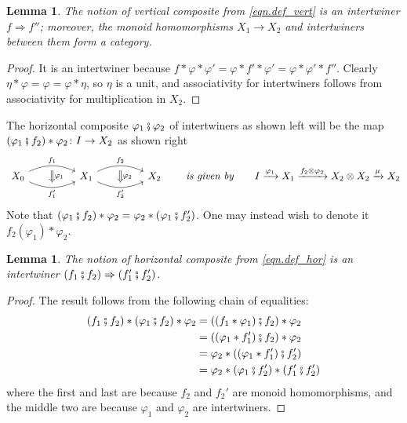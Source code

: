\documentclass[11pt, one side, article]{memoir}
\theoremstyle{definition}
\theoremstyle{plain}
\newtheorem{lemma}[definitionx]{Lemma}
\newcommand{\then}{\mathbin{\fatsemi}}
\newcommand{\To}[2][]{\xrightarrow[#1]{#2}}
\newcommand{\imp}{\Rightarrow}
\newcommand{\tn}[1]{\textnormal{#1}}
\newcommand{\0}{\textsf{0}}
\newcommand{\1}{\tn{\textsf{1}}}
\newcommand{\hh}[2][]{#1 \tn{\textit{#2}} #1}
\newcommand{\qqby}{\hh[\qquad]{is given by}}
\begin{document}
\begin{lemma}\label{lemma.ver_comp}
The notion of vertical composite from \eqref{eqn.def_vert} is an intertwiner $f\imp f''$; moreover, the monoid homomorphisms $X_1\to X_2$ and intertwiners between them form a category.
\end{lemma}
\begin{proof}
It is an intertwiner because $f*\varphi*\varphi'=\varphi*f'*\varphi'=\varphi*\varphi'*f''$. Clearly $\eta*\varphi=\varphi=\varphi*\eta$, so $\eta$ is a unit, and associativity for intertwiners follows from associativity for multiplication in $X_2$.
\end{proof}

The horizontal composite $\varphi_1\then\varphi_2$ of intertwiners as shown left will be the map $(\varphi_1\then f_2)*\varphi_2\colon I\to X_2$ as shown right
\begin{equation}\label{eqn.def_hor}
\begin{tikzcd}[column sep=45pt]
	X_0\ar[r, bend left=25pt, "f_1", ""' name=a1]\ar[r, bend right=25pt, "f_1'"', "" name=b1]&
	X_1\ar[r, bend left=25pt, "f_2", ""' name=a2]\ar[r, bend right=25pt, "f_2'"', "" name=b2]&
	X_2
	\ar[from=a1, to=b1, Rightarrow, "\varphi_1"]
	\ar[from=a2, to=b2, Rightarrow, "\varphi_2"]
\end{tikzcd}
\qqby
I\To{\varphi_1}X_1\To{f_2\otimes\varphi_2}X_2\otimes X_2\To{\mu}X_2
\end{equation}
Note that $(\varphi_1\then f_2)*\varphi_2=\varphi_2*(\varphi_1\then f_2')$. One may instead wish to denote it $f_2(\varphi_1)*\varphi_2$. 

\begin{lemma}\label{lemma.hor_comp}
The notion of horizontal composite from \eqref{eqn.def_hor} is an intertwiner $(f_1\then f_2)\imp (f_1'\then f_2')$.
\end{lemma}
\begin{proof}
The result follows from the following chain of equalities:
\begin{align*}
	(f_1\then f_2)*(\varphi_1\then f_2)*\varphi_2&=
	((f_1*\varphi_1)\then f_2)*\varphi_2\\&=
	((\varphi_1*f_1')\then f_2)*\varphi_2\\&=
	\varphi_2*((\varphi_1*f_1')\then f_2')\\&=
	\varphi_2*(\varphi_1\then f_2')*(f_1'\then f_2')
\end{align*}
where the first and last are because $f_2$ and $f_2'$ are monoid homomorphisms, and the middle two are because $\varphi_1$ and $\varphi_2$ are intertwiners.
\end{proof}
\end{document}
